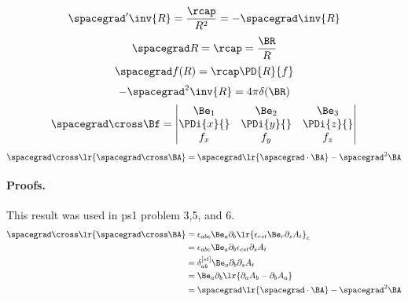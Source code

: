%
%
%
\begin{equation}\label{eqn:usefulFormulas:620}
\spacegrad' \inv{R} = \frac{\rcap}{R^2} = -\spacegrad \inv{R}
\end{equation}
\begin{equation}\label{eqn:usefulFormulas:640}
\spacegrad R = \rcap = \frac{\BR}{R}
\end{equation}
\begin{equation}\label{eqn:usefulFormulas:660}
\spacegrad f(R) = \rcap \PD{R}{f}
\end{equation}
\begin{equation}\label{eqn:usefulFormulas:680}
-\spacegrad^2 \inv{R} = 4\pi \delta(\BR)
\end{equation}
%
\begin{equation}\label{eqn:emtLecture1:60}
\spacegrad \cross \Bf
=
\begin{vmatrix}
\Be_1 & \Be_2 & \Be_3 \\
\PDi{x}{} &
\PDi{y}{} &
\PDi{z}{} \\
f_x & f_y & f_z
\end{vmatrix}
\end{equation}
%
\begin{equation}\label{eqn:usefulFormulas:700}
\spacegrad \cross \lr{ \spacegrad \cross \BA } = \spacegrad \lr{ \spacegrad \cdot \BA } - \spacegrad^2 \BA
\end{equation}
%
\paragraph{Proofs.}
%
This result was used in ps1 problem 3,5, and 6.
%
\begin{equation}\label{eqn:emtProblemSet1Appendix:460}
\begin{aligned}
\spacegrad \cross \lr{ \spacegrad \cross \BA }
&=
\epsilon_{a b c} \Be_a \partial_b \lr{ \epsilon_{r s t} \Be_r \partial_s A_t }_c
\\ &=
\epsilon_{a b c} \Be_a \partial_b \epsilon_{c s t} \partial_s A_t
\\ &=
\delta_{ab}^{[st]}
\Be_a \partial_b \partial_s A_t
\\ &=
\Be_a \partial_b \lr{ \partial_a A_b - \partial_b A_a }
\\ &=
\spacegrad \lr{ \spacegrad \cdot \BA } - \spacegrad^2 \BA
\end{aligned}
\end{equation}
%
